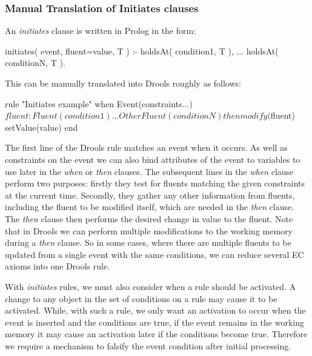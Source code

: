 \subsubsection*{Manual Translation of Initiates clauses}

An \emph{initiates} clause is written in Prolog in the form:

\begin{prologinline}
initiates( event, fluent=value, T ) :-
	holdsAt( condition1, T ),
	...
	holdsAt( conditionN, T ).
\end{prologinline}

This can be manually translated into Drools roughly as follows:
\begin{droolsinline}
rule "Initiates example"
when
	Event(constraints...)
	$fluent : Fluent(condition1)
	...
	OtherFluent(conditionN)
then
	modify($fluent) {
		setValue(value)
	}
end
\end{droolsinline}

The first line of the Drools rule matches an event when it occurs. As well as
constraints on the event we can also bind attributes of the event to variables
to use later in the \emph{when} or \emph{then} clauses. The subsequent lines
in the \emph{when} clause perform two purposes: firstly they test for fluents
matching the given constraints at the current time. Secondly, they gather any
other information from fluents, including the fluent to be modified itself,
which are needed in the \emph{then} clause. The \emph{then} clause then
performs the desired change in value to the fluent. Note that in Drools we can
perform multiple modifications to the working memory during a \emph{then}
clause. So in some cases, where there are multiple fluents to be updated from
a single event with the same conditions, we can reduce several \ac{EC} axioms
into one Drools rule.

With \emph{initiates} rules, we must also consider when a rule should be activated. A
change to any object in the set of conditions on a rule may cause it to be
activated. While, with such a rule, we only want an activation to occur when the
event is inserted and the conditions are true, if the event remains in the
working memory it may cause an activation later if the conditions become true.
Therefore we require a mechanism to falsify the event condition after initial
processing.

